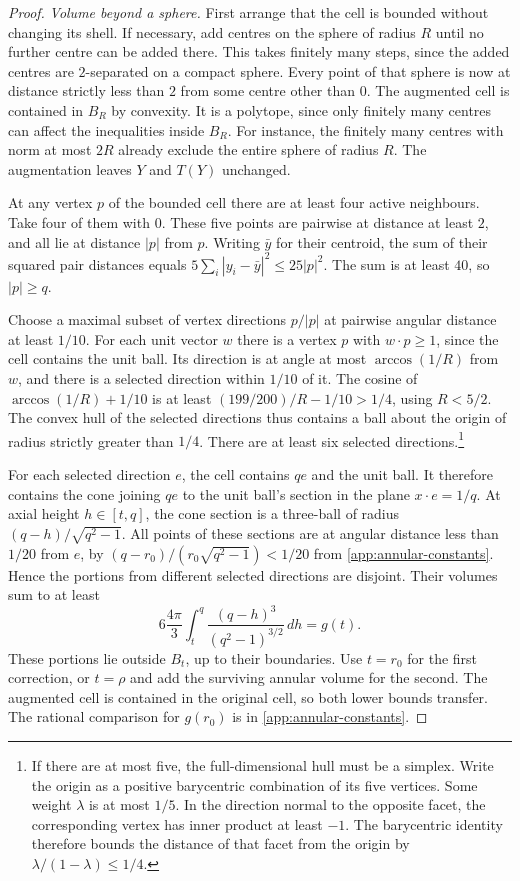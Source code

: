 \begin{proof}
\emph{Volume beyond a sphere.}
First arrange that the cell is bounded without changing its shell.
If necessary, add centres on the sphere of radius \(R\) until no
further centre can be added there. This takes finitely many steps,
since the added centres are \(2\)-separated on a compact sphere.
Every point of that sphere is now at distance strictly less than
\(2\) from some centre other than \(0\). The augmented cell is
contained in \(B_R\) by convexity. It is a polytope, since only
finitely many centres can affect the inequalities inside \(B_R\).
For instance, the finitely many centres with norm at most \(2R\)
already exclude the entire sphere of radius \(R\).
The augmentation leaves \(Y\) and \(T(Y)\) unchanged.

At any vertex \(p\) of the bounded cell there are at least four
active neighbours. Take four of them with \(0\). These five points
are pairwise at distance at least \(2\), and all lie at distance
\(|p|\) from \(p\). Writing \(\bar y\) for their centroid, the sum
of their squared pair distances equals
\(5\sum_i |y_i-\bar y|^2\le 25|p|^2\).
The sum is at least \(40\), so \(|p|\ge q\).

Choose a maximal subset of vertex directions \(p/|p|\) at pairwise
angular distance at least \(1/10\). For each unit vector \(w\) there
is a vertex \(p\) with \(w\cdot p\ge1\), since the cell contains
the unit ball. Its direction is at angle at most \(\arccos(1/R)\)
from \(w\), and there is a selected direction within \(1/10\) of it.
The cosine of \(\arccos(1/R)+1/10\) is at least
\((199/200)/R-1/10>1/4\), using \(R<5/2\).
The convex hull of the selected directions thus contains a ball
about the origin of radius strictly greater than \(1/4\).
There are at least six selected directions.\footnote{If there are
at most five, the full-dimensional hull must be a simplex.
Write the origin as a positive barycentric combination of its five
vertices. Some weight \(\lambda\) is at most \(1/5\).
In the direction normal to the opposite facet, the corresponding
vertex has inner product at least \(-1\). The barycentric identity
therefore bounds the distance of that facet from the origin by
\(\lambda/(1-\lambda)\le1/4\).}

For each selected direction \(e\), the cell contains \(qe\) and
the unit ball. It therefore contains the cone joining \(qe\) to
the unit ball's section in the plane \(x\cdot e=1/q\).
At axial height \(h\in[t,q]\), the cone section is a three-ball
of radius \((q-h)/\sqrt{q^2-1}\). All points of these sections are
at angular distance less than \(1/20\) from \(e\), by
\((q-r_0)/(r_0\sqrt{q^2-1})<1/20\) from
\cref{app:annular-constants}. Hence the portions from different
selected directions are disjoint. Their volumes sum to at least
\[
 6\frac{4\pi}{3}\int_t^q
       \frac{(q-h)^3}{(q^2-1)^{3/2}}\,dh=g(t).
\]
These portions lie outside \(B_t\), up to their boundaries.
Use \(t=r_0\) for the first correction, or \(t=\rho\) and add
the surviving annular volume for the second. The augmented cell
is contained in the original cell, so both lower bounds transfer.
The rational comparison for \(g(r_0)\) is in
\cref{app:annular-constants}.
\end{proof}


